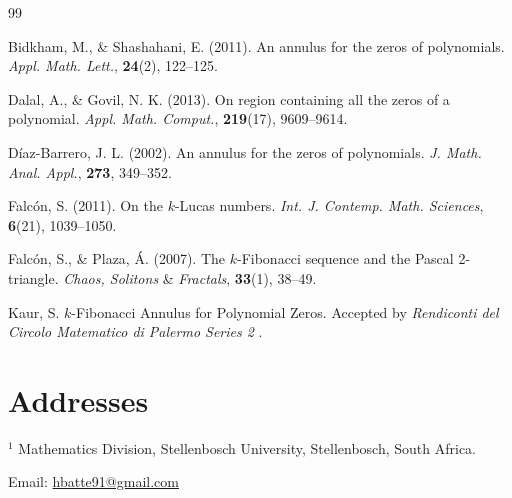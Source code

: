 \documentclass[11pt,a4paper]{article}
\numberwithin{equation}{section}
\numberwithin{table}{section}
\numberwithin{figure}{section}
\begin{document}
\begin{thebibliography}{99}
	
Bidkham, M., \& Shashahani, E. (2011). An annulus for the zeros of polynomials. \textit{Appl. Math. Lett.}, \textbf{24}(2), 122--125.

Dalal, A., \& Govil, N. K. (2013). On region containing all the zeros of a polynomial. \textit{Appl. Math. Comput.}, \textbf{219}(17), 9609--9614.

D\'iaz-Barrero, J. L. (2002). An annulus for the zeros of polynomials. \textit{J. Math. Anal. Appl.}, \textbf{273}, 349--352.
		
Falc\'on, S. (2011). On the $k$-Lucas numbers. \textit{Int. J. Contemp. Math. Sciences}, \textbf{6}(21), 1039--1050.

Falc\'on, S., \& Plaza, \'A. (2007). The $k$-Fibonacci sequence and the Pascal 2-triangle. \textit{Chaos, Solitons} \& \textit{Fractals}, \textbf{33}(1), 38--49.


Kaur, S. $k$-Fibonacci Annulus for Polynomial Zeros. Accepted by \textit{Rendiconti del Circolo Matematico di Palermo Series 2 }.

\end{thebibliography}
	
	\section*{Addresses}
	$ ^{1} $ Mathematics Division, Stellenbosch University, Stellenbosch, South Africa.
	
	Email: \url{hbatte91@gmail.com}
\end{document}
